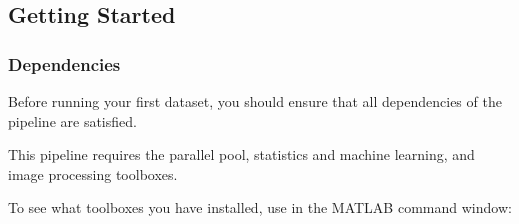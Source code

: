\documentclass[letterpaper,10pt,english]{sphinxmanual}
\begin{document}
\sphinxstepscope


\subsection{Getting Started}
\label{\detokenize{get_started/getting_started:getting-started}}\label{\detokenize{get_started/getting_started::doc}}

\subsubsection{Dependencies}
\label{\detokenize{get_started/getting_started:dependencies}}
\sphinxAtStartPar
Before running your first dataset, you should ensure that all dependencies of the pipeline are satisfied.

\sphinxAtStartPar
This pipeline requires the parallel pool, statistics and machine learning, and image processing toolboxes.

\sphinxAtStartPar
To see what toolboxes you have installed, use  in the MATLAB command window:
\end{document}
